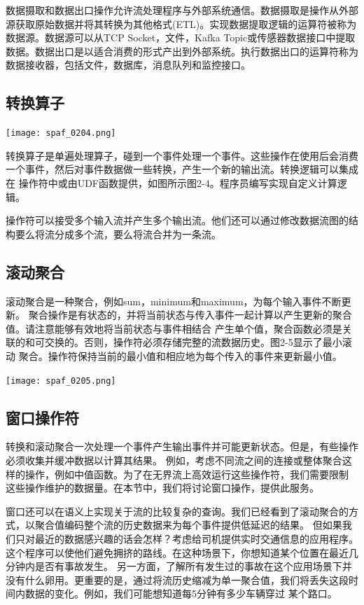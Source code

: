 \documentclass[oneside]{ctexbook}
\begin{document}
数据摄取和数据出口操作允许流处理程序与外部系统通信。数据摄取是操作从外部源获取原始数据并将其转换为其他格式(ETL)。实现数据提取逻辑的运算符被称为数据源。数据源可以从TCP
Socket，文件，Kafka Topic或传感器数据接口中提取数据。数据出口是以适合消费的形式产出到外部系统。执行数据出口的运算符称为数据接收器，包括文件，数据库，消息队列和监控接口。

\subsection{转换算子}

\noindent\texttt{[image: spaf\_0204.png]}

转换算子是单遍处理算子，碰到一个事件处理一个事件。这些操作在使用后会消费一个事件，然后对事件数据做一些转换，产生一个新的输出流。转换逻辑可以集成在
操作符中或由UDF函数提供，如图所示图2-4。程序员编写实现自定义计算逻辑。

操作符可以接受多个输入流并产生多个输出流。他们还可以通过修改数据流图的结构要么将流分成多个流，要么将流合并为一条流。

\subsection{滚动聚合}

滚动聚合是一种聚合，例如sum，minimum和maximum，为每个输入事件不断更新。
聚合操作是有状态的，并将当前状态与传入事件一起计算以产生更新的聚合值。请注意能够有效地将当前状态与事件相结合
产生单个值，聚合函数必须是关联的和可交换的。否则，操作符必须存储完整的流数据历史。图2-5显示了最小滚动
聚合。操作符保持当前的最小值和相应地为每个传入的事件来更新最小值。

\noindent\texttt{[image: spaf\_0205.png]}

\subsection{窗口操作符}

转换和滚动聚合一次处理一个事件产生输出事件并可能更新状态。但是，有些操作必须收集并缓冲数据以计算其结果。
例如，考虑不同流之间的连接或整体聚合这样的操作，例如中值函数。为了在无界流上高效运行这些操作符，我们需要限制
这些操作维护的数据量。在本节中，我们将讨论窗口操作，提供此服务。

窗口还可以在语义上实现关于流的比较复杂的查询。我们已经看到了滚动聚合的方式，以聚合值编码整个流的历史数据来为每个事件提供低延迟的结果。
但如果我们只对最近的数据感兴趣的话会怎样？考虑给司机提供实时交通信息的应用程序。这个程序可以使他们避免拥挤的路线。在这种场景下，你想知道某个位置在最近几分钟内是否有事故发生。
另一方面，了解所有发生过的事故在这个应用场景下并没有什么卵用。更重要的是，通过将流历史缩减为单一聚合值，我们将丢失这段时间内数据的变化。例如，我们可能想知道每5分钟有多少车辆穿过
某个路口。
\end{document}
